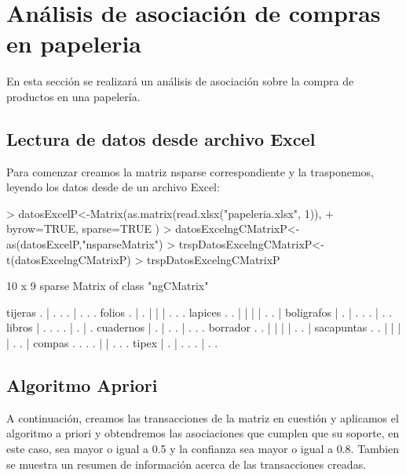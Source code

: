 \documentclass [a4paper] {article}
\begin{document}
\section{Análisis de asociación de compras en papeleria }
En esta sección se realizará un análisis de asociación sobre la compra de productos
en una papelería.

\subsection{Lectura de datos desde archivo Excel}
Para comenzar creamos la matriz nsparse correspondiente y la trasponemos,
leyendo los datos desde de un archivo Excel:

\begin{Schunk}
\begin{Sinput}
> datosExcelP<-Matrix(as.matrix(read.xlsx("papeleria.xlsx", 1)),
+ byrow=TRUE, sparse=TRUE )
> datosExcelngCMatrixP<-as(datosExcelP,"nsparseMatrix")
> trspDatosExcelngCMatrixP<-t(datosExcelngCMatrixP)
> trspDatosExcelngCMatrixP
\end{Sinput}
\begin{Soutput}
10 x 9 sparse Matrix of class "ngCMatrix"
                            
tijeras    . | . . . | . . .
folios     . | . | | | . . .
lapices    . . | | | | . . |
boligrafos | . | . . . | . .
libros     | . . . . | . | .
cuadernos  | . | . . | . . .
borrador   . . | | | | . . |
sacapuntas . . | | | | . . |
compas     . . . . | | . . .
tipex      | . | . . . | . .
\end{Soutput}
\end{Schunk}

\subsection{Algoritmo Apriori}
A continuación, creamos las transacciones de la matriz en cuestión y aplicamos 
el algoritmo a priori y obtendremos las asociaciones que cumplen que su soporte,
en este caso, sea mayor o igual a 0.5 y la confianza sea mayor o igual a 0.8.
Tambien se muestra un resumen de información acerca de las transacciones creadas.
\end{document}

